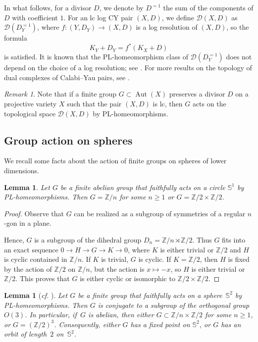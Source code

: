 \documentclass[11pt]{amsart}
\numberwithin{equation}{section}
\newtheorem{lem}[thm]{Lemma}
\theoremstyle{definition}
\theoremstyle{remark}
\newtheorem{remark}[thm]{Remark}
\DeclareMathOperator{\Aut}{Aut}
\begin{document}
In what follows, for a divisor $D$, we denote by $D^{=1}$ the sum of the components of $D$ with coefficient $1$. For an lc log CY pair $(X, D)$, we define $\mathcal{D}(X, D)$ as $\mathcal{D}(D_Y^{=1})$, where $f\colon (Y, D_Y)\to (X, D)$ is a log resolution of $(X, D)$, so the formula
\[
K_{Y} + D_Y= f^*(K_X + D)
\]
is satisfied. It is known that the PL-homeomorphism class of $\mathcal{D}(D_Y^{=1})$ does not depend on the choice of a log resolution; see \cite[Proposition 11]{dFKX17}.  For more results on the topology of dual complexes of Calabi--Yau pairs, see \cite{KX16}.

\begin{remark}
Note that if a finite group $G\subset \Aut(X)$ preserves a divisor $D$ on a projective variety $X$ such that the pair $(X, D)$ is lc, then $G$ acts on the topological space $\mathcal{D}(X, D)$ by PL-homeomorphisms.
\end{remark}

\subsection{Group action on spheres}
We recall some facts about the action of finite groups on spheres of lower dimensions. 

\begin{lem}
\label{lem-action-on-spheres-1}
Let $G$ be a finite abelian group that faithfully acts on a circle $\mathbb{S}^1$ by PL-homeomorphisms. Then $G=\mathbb{Z}/n$ for some $n\geq 1$ or $G=\mathbb{Z}/2\times\mathbb{Z}/2$. 
\end{lem}

\begin{proof}
Observe that $G$ can be realized as a subgroup of symmetries of a regular $n$-gon in a plane. 
 
Hence, $G$ is a subgroup of the dihedral group $D_n=\mathbb{Z}/n \rtimes \mathbb{Z}/2$. Thus $G$ fits into an exact sequence $0 \to H \to G \to K \to 0$, where $K$ is either trivial or $\mathbb{Z}/2$ and $H$ is cyclic contained in $\mathbb{Z}/n$. If $K$ is trivial, $G$ is cyclic. If $K = \mathbb{Z}/2$, then $H$ is fixed by the action of $\mathbb{Z}/2$ on $\mathbb{Z}/n$, but the action is $x \mapsto -x$, so $H$ is either trivial or $\mathbb{Z}/2$. This proves that $G$ is either cyclic or isomorphic to $\mathbb{Z}/2 \times \mathbb{Z}/2$.
\end{proof}

\begin{lem}[\textit{cf.} {\cite[Section 2]{Zim12}}]
\label{lem-action-on-spheres}
Let $G$ be a finite group that faithfully acts on a sphere~$\mathbb{S}^2$ by PL-ho\-meo\-mor\-phisms. Then $G$ is conjugate to a subgroup of the orthogonal group~$O(3)$. In particular, if\, $G$ is abelian, then either $G\subset \mathbb{Z}/n\times\mathbb{Z}/2$ for some $n\geq 1$, or $G=(\mathbb{Z}/2)^3$. Consequently, either $G$ has a fixed point on $\mathbb{S}^2$, or $G$ has an orbit of length~$2$ on~$\mathbb{S}^2$.
\end{lem}
\end{document}
